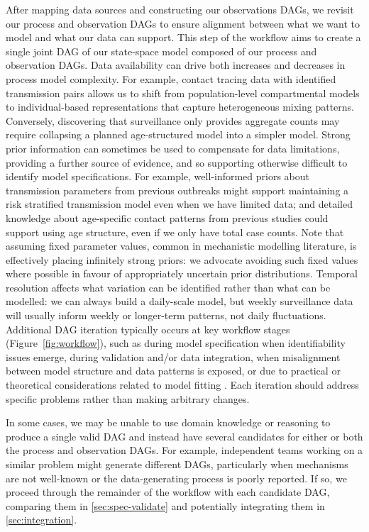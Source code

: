 \documentclass{article}
\begin{document}
After mapping data sources and constructing our observations \ac{DAG}s, we revisit our process and observation \ac{DAG}s to ensure alignment between what we want to model and what our data can support.
This step of the workflow aims to create a single joint \ac{DAG} of our state-space model composed of our process and observation \ac{DAG}s.
Data availability can drive both increases and decreases in process model complexity.
For example, contact tracing data with identified transmission pairs allows us to shift from population-level compartmental models to individual-based representations that capture heterogeneous mixing patterns.
Conversely, discovering that surveillance only provides aggregate counts may require collapsing a planned age-structured model into a simpler model.
Strong prior information can sometimes be used to compensate for data limitations, providing a further source of evidence, and so supporting otherwise difficult to identify model specifications.
For example, well-informed priors about transmission parameters from previous outbreaks might support maintaining a risk stratified transmission model even when we have limited data; and detailed knowledge about age-specific contact patterns from previous studies could support using age structure, even if we only have total case counts.
Note that assuming fixed parameter values, common in mechanistic modelling literature, is effectively placing infinitely strong priors: we advocate avoiding such fixed values where possible in favour of appropriately uncertain prior distributions.
Temporal resolution affects what variation can be identified rather than what can be modelled: we can always build a daily-scale model, but weekly surveillance data will usually inform weekly or longer-term patterns, not daily fluctuations.
Additional \ac{DAG} iteration typically occurs at key workflow stages (Figure~\ref{fig:workflow}), such as during model specification when identifiability issues emerge, during validation and/or data integration, when misalignment between model structure and data patterns is exposed, or due to practical or theoretical considerations related to model fitting \citep{corbella2022inferring}.
Each iteration should address specific problems rather than making arbitrary changes.

In some cases, we may be unable to use domain knowledge or reasoning to produce a single valid DAG and instead have several candidates for either or both the process and observation \ac{DAG}s. For example, independent teams working on a similar problem might generate different \ac{DAG}s, particularly when mechanisms are not well-known or the data-generating process is poorly reported. If so, we proceed through the remainder of the workflow with each candidate \ac{DAG}, comparing them in \ref{sec:spec-validate} and potentially integrating them in \ref{sec:integration}.
\end{document}

